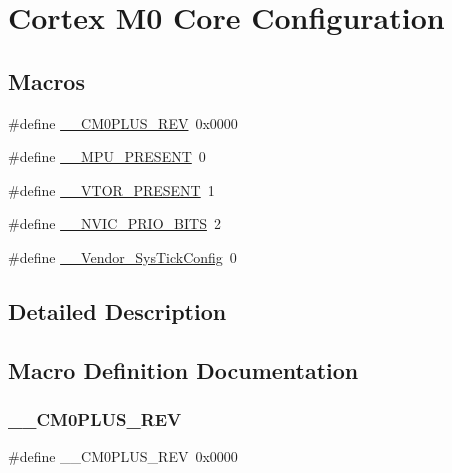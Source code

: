 \hypertarget{group___cortex___core___configuration}{}\section{Cortex M0 Core Configuration}
\label{group___cortex___core___configuration}
\subsection*{Macros}
\begin{DoxyCompactItemize}
\item 
\#define \mbox{\hyperlink{group___cortex___core___configuration_ga2b7180ed347a0e902c5765deb46e650e}{\+\_\+\+\_\+\+C\+M0\+P\+L\+U\+S\+\_\+\+R\+EV}}~0x0000
\item 
\#define \mbox{\hyperlink{group___cortex___core___configuration_ga4127d1b31aaf336fab3d7329d117f448}{\+\_\+\+\_\+\+M\+P\+U\+\_\+\+P\+R\+E\+S\+E\+NT}}~0
\item 
\#define \mbox{\hyperlink{group___cortex___core___configuration_gaddbae1a1b57539f398eb5546a17de8f6}{\+\_\+\+\_\+\+V\+T\+O\+R\+\_\+\+P\+R\+E\+S\+E\+NT}}~1
\item 
\#define \mbox{\hyperlink{group___cortex___core___configuration_gae3fe3587d5100c787e02102ce3944460}{\+\_\+\+\_\+\+N\+V\+I\+C\+\_\+\+P\+R\+I\+O\+\_\+\+B\+I\+TS}}~2
\item 
\#define \mbox{\hyperlink{group___cortex___core___configuration_gab58771b4ec03f9bdddc84770f7c95c68}{\+\_\+\+\_\+\+Vendor\+\_\+\+Sys\+Tick\+Config}}~0
\end{DoxyCompactItemize}


\subsection{Detailed Description}


\subsection{Macro Definition Documentation}
\mbox{\label{group___cortex___core___configuration_ga2b7180ed347a0e902c5765deb46e650e}} 
\subsubsection{\texorpdfstring{\_\_CM0PLUS\_REV}{\_\_CM0PLUS\_REV}}
{\footnotesize\ttfamily \#define \+\_\+\+\_\+\+C\+M0\+P\+L\+U\+S\+\_\+\+R\+EV~0x0000}

